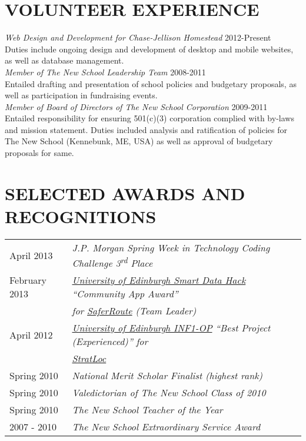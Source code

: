\documentclass[line, margin]{res}
\newcommand{\ts}{\textsuperscript}
\begin{document}
\begin{resume}
\section{VOLUNTEER EXPERIENCE}
\textit{Web Design and Development for Chase-Jellison Homestead} \hfill 2012-Present \\Duties include ongoing design and development of desktop and mobile websites, as well as database management. \\[5pt]
\textit{Member of The New School Leadership Team} \hfill 2008-2011 \\
Entailed drafting and presentation of school policies and budgetary proposals, as well as participation in fundraising events. \\[5pt]
\textit{Member of Board of Directors of The New School Corporation} \hfill 2009-2011 \\
Entailed responsibility for ensuring 501(c)(3) corporation complied with by-laws and mission statement. Duties included analysis and ratification of policies for The New School (Kennebunk, ME, USA) as well as approval of budgetary proposals for same. 

\section{SELECTED AWARDS AND RECOGNITIONS}
\begin{tabular}{@{}l l}
April 2013 & \textit{J.P. Morgan Spring Week in Technology Coding Challenge 3\ts{rd} Place}\linebreak \\[5pt]
February 2013 & \textit{\href{http://data.inf.ed.ac.uk/ilwhack/finalprojects.php}{University of Edinburgh Smart Data Hack} ``Community App Award''}\linebreak\\[1pt] 
&\textit{for \href{https://github.com/team-tusive/ilwhack}{SaferRoute} (Team Leader)} \linebreak \\[5pt]
April 2012 & \textit{\href{https://sites.google.com/site/2012oop/winners}{University of Edinburgh INF1-OP} ``Best Project (Experienced)'' for} \linebreak \\[1pt] 
 &\textit{\href{http://www.chasestevens.com/team2civ/}{StratLoc}} \linebreak \\[5pt]
Spring 2010 & \textit{National Merit Scholar Finalist (highest rank)} \\[5pt]
Spring 2010 & \textit{Valedictorian of The New School Class of 2010} \\[5pt]
Spring 2010 & \textit{The New School Teacher of the Year} \\[5pt]
2007 - 2010 & \textit{The New School Extraordinary Service Award} \\[5pt]
\end{tabular}
\end{resume}
\end{document}
